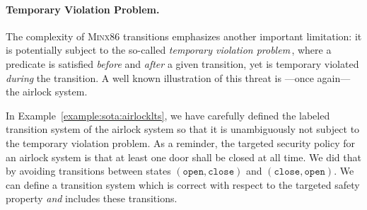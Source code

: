 \paragraph{Temporary Violation Problem.}
%
The complexity of {\scshape Minx86} transitions emphasizes another important
limitation: it is potentially subject to the so-called \emph{temporary violation
  problem}\,\cite{muller2006tempviolation}, where a predicate is satisfied
\emph{before} and \emph{after} a given transition, yet is temporary violated
\emph{during} the transition.
%
A well known illustration of this threat is ---once again--- the airlock system.

\begin{example}
  In Example~\ref{example:sota:airlocklts}, we have carefully defined the
  labeled transition system of the airlock system so that it is unambiguously
  not subject to the temporary violation problem.
  As a reminder, the targeted security policy for an airlock system is that at
  least one door shall be closed at all time.
  We did that by avoiding transitions between states 
  \( (\mathtt{open}, \mathtt{close}) \) and
  \( (\mathtt{close}, \mathtt{open}) \).
  We can define a transition system which is correct with respect to the
  targeted safety property \emph{and} includes these transitions.

  \begin{center}
\end{center}
\end{example}
